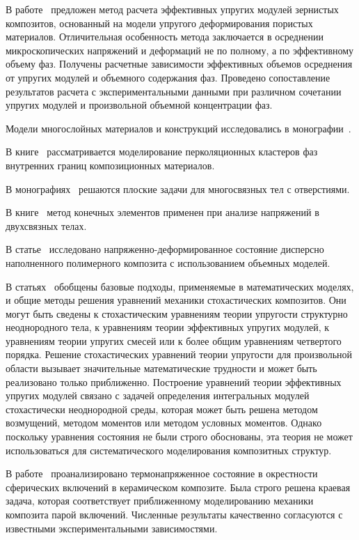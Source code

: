 В работе~\cite{Fedotov} предложен метод расчета эффективных упругих модулей зернистых композитов, основанный на модели упругого деформирования пористых материалов. Отличительная особенность метода заключается в осреднении микроскопических напряжений и деформаций не по полному, а по эффективному объему фаз. Получены расчетные зависимости эффективных объемов осреднения от упругих модулей и объемного содержания фаз. Проведено сопоставление результатов расчета с экспериментальными данными при различном сочетании упругих модулей и произвольной объемной концентрации фаз.

Модели многослойных материалов и конструкций исследовались в монографии~\cite{Bolotin}.

В книге~\cite{Gerega} рассматривается моделирование перколяционных кластеров фаз внутренних границ композиционных материалов.

В монографиях~\cite{Grigoliuk, Savin} решаются плоские задачи для многосвязных тел с отверстиями.

В книге~\cite{Erzhanov} метод конечных элементов применен при анализе напряжений в двухсвязных телах.

В статье~\cite{Zharkov} исследовано напряженно-деформированное состояние дисперсно наполненного полимерного композита с использованием объемных моделей.

В статьях~\cite{Khoroshun2000-1, Khoroshun2000-2, Scalon, Trias} обобщены базовые подходы, применяемые в математических моделях, и общие методы решения уравнений механики стохастических композитов. Они могут быть сведены к стохастическим уравнениям теории упругости структурно неоднородного тела, к уравнениям теории эффективных упругих модулей, к уравнениям теории упругих смесей или к более общим уравнениям четвертого порядка. Решение стохастических уравнений теории упругости для произвольной области вызывает значительные математические трудности и может быть реализовано только приближенно. Построение уравнений теории эффективных упругих модулей связано с задачей определения интегральных модулей стохастически неоднородной среды, которая может быть решена методом возмущений, методом моментов или методом условных моментов. Однако поскольку уравнения состояния не были строго обоснованы, эта теория не может использоваться для систематического моделирования композитных структур.

В работе~\cite{Golovchan2000} проанализировано термонапряженное состояние в окрестности сферических включений в   керамическом композите. Была строго решена краевая задача, которая соответствует приближенному моделированию механики композита парой включений. Численные результаты качественно согласуются с известными экспериментальными зависимостями.

